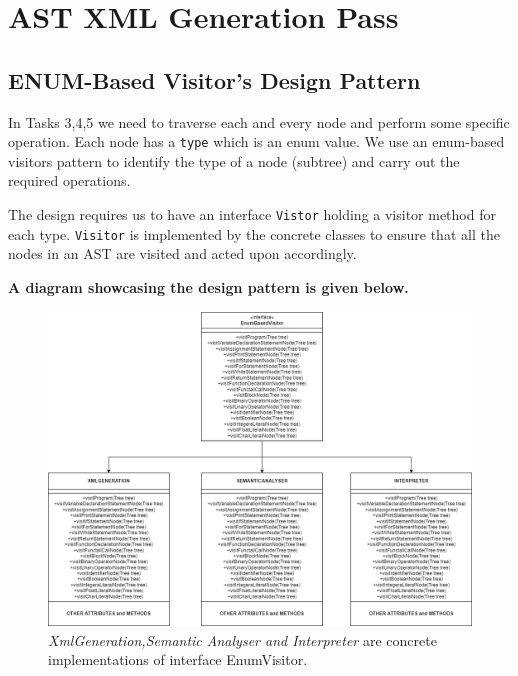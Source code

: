 \chapter{AST XML Generation Pass}
\section{ENUM-Based Visitor's Design Pattern}
In Tasks 3,4,5 we need to traverse each and every node and perform some specific operation. Each node has a \verb!type! which is an enum value. We use an enum-based visitors pattern  to identify the type of a node (subtree)  and carry out the required operations.


The design requires us to have an interface  \verb!Vistor! holding a visitor method for each type.  \verb!Visitor! is implemented by the concrete classes to ensure that all the nodes in an AST are visited and acted upon accordingly.

\textbf{A diagram showcasing the design pattern is given below.}

\begin{landscape}
\begin{figure}[H]
    \centering
        
    \includegraphics[scale=0.5]{Task345/images/UML.png}
    
    \caption{\emph{XmlGeneration,Semantic Analyser and Interpreter} are concrete implementations of interface EnumVisitor.}
    \label{fig:enum based visitors design pattern}
\end{figure}
\end{landscape}

